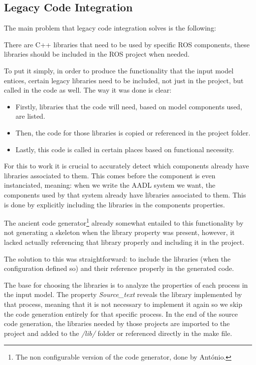 \subsection{Legacy Code Integration}
\label{sec:impl_legacy_code}

The main problem that legacy code integration solves is the following:

There are C++ libraries that need to be used by specific \gls{ROS} components, these libraries should be included in the \gls{ROS} project when needed.

To put it simply, in order to produce the functionality that the input model entices, certain legacy libraries need to be included, not just in the project, but called in the code as well. The way it was done is clear:

\begin{itemize} 
	\item Firstly, libraries that the code will need, based on model components used, are listed.
	\item Then, the code for those libraries is copied or referenced in the project folder.
	\item Lastly, this code is called in certain places based on functional necessity.
\end{itemize}

For this to work it is crucial to accurately detect which components already have libraries associated to them. This comes before the component is even instanciated, meaning: when we write the \gls{AADL} system we want, the components used by that system already have libraries associated to them. This is done by explicitly including the libraries in the components properties.

The ancient code generator\footnote{The non configurable version of the code generator, done by António.} already somewhat entailed to this functionality by not generating a skeleton when the library property was present, however, it lacked actually referencing that library properly and including it in the project.

The solution to this was straightforward: to include the libraries (when the configuration defined so) and their reference properly in the generated code.

The base for choosing the libraries is to analyze the properties of each process in the input model. The property \textit{Source\_text} reveals the library implemented by that process, meaning that it is not necessary to implement it again so we skip the code generation entirely for that specific process. In the end of the source code generation, the libraries needed by those projects are imported to the project and added to the \textit{/lib/} folder or referenced directly in the make file.

